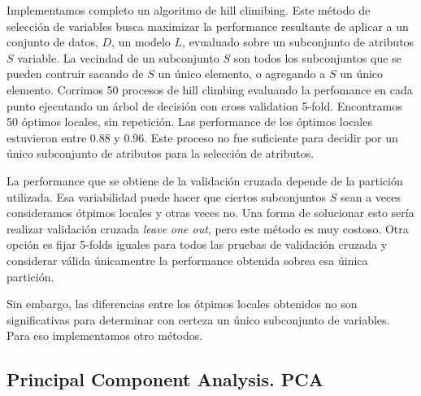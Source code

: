 \documentclass[a4paper,10pt]{article}
\begin{document}
Implementamos completo un algoritmo de hill climibing. Este m\'etodo de selecci\'on de variables busca maximizar la performance resultante de aplicar a un conjunto de datos, $D$, un modelo $L$, evualuado sobre un subconjunto de atributos $S$ variable. La vecindad de un subconjunto $S$ son todos los subconjuntos que se pueden contruir sacando de $S$ un \'unico elemento, o agregando a $S$ un \'unico elemento. Corrimos 50 procesos de hill climbing evaluando la perfomance en cada punto ejecutando un \'arbol de decisi\'on con cross validation 5-fold. Encontramos 50 \'optimos locales, sin repetici\'on. Las performance de los \'optimos locales estuvieron entre 0.88 y 0.96. Este proceso no fue suficiente para decidir por un \'unico subconjunto de atributos para la selecci\'on de atributos. 

La performance que se obtiene de la validaci\'on cruzada depende de la partici\'on utilizada. Esa variabilidad puede hacer que ciertos subconjuntos $S$ sean a veces consideramos \'otpimos locales y otras veces no. Una forma de solucionar esto ser\'ia realizar validaci\'on cruzada \emph{leave one out}, pero este m\'etodo es muy costoso. Otra opci\'on es fijar 5-folds iguales para todos las pruebas de validaci\'on cruzada y considerar v\'alida \'unicamentre la performance obtenida sobrea esa \'uinica partici\'on.  

Sin embargo, las diferencias entre los \'otpimos locales obtenidos no son significativas para determinar con certeza un \'unico subconjunto de variables. Para eso implementamos otro m\'etodos. 

\subsection{Principal Component Analysis. PCA}
\end{document}
